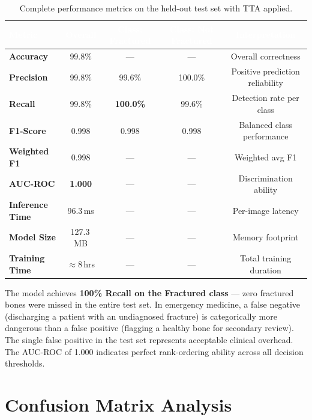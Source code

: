 \documentclass[12pt, a4paper]{article}
\begin{document}
\begin{table}[H]
\centering
\caption{Complete performance metrics on the held-out test set with TTA applied.}
\label{tab:metrics}
\begin{tabularx}{\textwidth}{>{\bfseries}lcccc}
\toprule
\rowcolor{NavyBlue}
\textcolor{white}{Metric} &
\textcolor{white}{Overall} &
\textcolor{white}{Class: Fractured} &
\textcolor{white}{Class: Not Fractured} &
\textcolor{white}{Interpretation} \\
\midrule
Accuracy        & 99.8\%  & —      & —      & Overall correctness \\
Precision       & 99.8\%  & 99.6\% & 100.0\%& Positive prediction reliability \\
Recall          & 99.8\%  & \textbf{100.0\%} & 99.6\% & Detection rate per class \\
F1-Score        & 0.998   & 0.998  & 0.998  & Balanced class performance \\
Weighted F1     & 0.998   & —      & —      & Weighted avg F1 \\
AUC-ROC         & \textbf{1.000}  & — & — & Discrimination ability \\
Inference Time  & 96.3\,ms & —     & —      & Per-image latency \\
Model Size      & 127.3\,MB & —    & —      & Memory footprint \\
Training Time   & $\approx$8\,hrs & — & —   & Total training duration \\
\bottomrule
\end{tabularx}
\end{table}

\begin{tcolorbox}[keyresult, title={\bfseries\color{NavyBlue} Key Clinical Result}]
The model achieves \textbf{100\% Recall on the Fractured class} — zero fractured bones were
missed in the entire test set. In emergency medicine, a false negative (discharging a patient
with an undiagnosed fracture) is categorically more dangerous than a false positive (flagging a
healthy bone for secondary review). The single false positive in the test set represents
acceptable clinical overhead. The AUC-ROC of 1.000 indicates perfect rank-ordering ability
across all decision thresholds.
\end{tcolorbox}

\section{Confusion Matrix Analysis}
\end{document}

